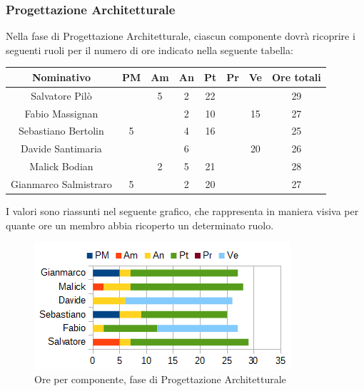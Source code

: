		\subsubsection{Progettazione Architetturale}
		Nella fase di Progettazione Architetturale, ciascun componente dovrà ricoprire i seguenti ruoli per il numero di ore indicato nella seguente tabella: \\
		\begin{table}[H]
		\centering
		\begin{tabular}{|c|c|c|c|c|c|c|c|}
			\hline
			\textbf{Nominativo}		& \textbf{PM}	& \textbf{Am}	& \textbf{An}	& \textbf{Pt}	& \textbf{Pr}	& \textbf{Ve}	& \textbf{Ore totali}     \\
			\hline
			Salvatore Pilò			& 		& 5 	& 2		& 22	&		&		& 29 \\
			Fabio Massignan			&		& 		& 2		& 10	&		& 15	& 27 \\
			Sebastiano Bertolin		& 5		& 		& 4		& 16	&		&		& 25 \\
			Davide Santimaria		&		& 		& 6		&		&		& 20	& 26 \\
			Malick Bodian			& 		& 2		& 5		& 21	&		& 		& 28 \\
			Gianmarco Salmistraro	& 5		& 		& 2		& 20	&		& 		& 27 \\
			\hline
		\end{tabular}
		\end{table}
		I valori sono riassunti nel seguente grafico, che rappresenta in maniera visiva per quante ore un membro abbia ricoperto un determinato ruolo. \\
		\begin{figure}[H]
			\centering
			\includegraphics[scale=1]{immagini/grafici/progettazione_architetturale-barra.png}
			\caption{Ore per componente, fase di Progettazione Architetturale}
		\end{figure}
